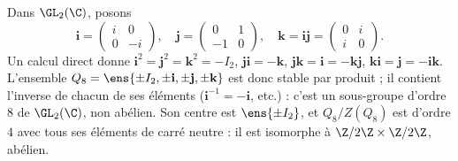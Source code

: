 \begin{exemple}\label{ex-q8}
Dans $\GL_2(\C)$, posons
\[\mathbf i=\begin{pmatrix}i&0\\0&-i\end{pmatrix},\quad\mathbf j=\begin{pmatrix}0&1\\-1&0\end{pmatrix},\quad\mathbf k=\mathbf i\mathbf j=\begin{pmatrix}0&i\\i&0\end{pmatrix}.\]
Un calcul direct donne $\mathbf i^2=\mathbf j^2=\mathbf k^2=-I_2$, $\mathbf j\mathbf i=-\mathbf k$, $\mathbf j\mathbf k=\mathbf i=-\mathbf k\mathbf j$, $\mathbf k\mathbf i=\mathbf j=-\mathbf i\mathbf k$. L'ensemble $Q_8=\ens{\pm I_2,\pm\mathbf i,\pm\mathbf j,\pm\mathbf k}$ est donc stable par produit ; il contient l'inverse de chacun de ses éléments ($\mathbf i^{-1}=-\mathbf i$, etc.) : c'est un sous-groupe d'ordre $8$ de $\GL_2(\C)$, non abélien. Son centre est $\ens{\pm I_2}$, et $Q_8/Z(Q_8)$ est d'ordre $4$ avec tous ses éléments de carré neutre : il est isomorphe à $\Z/2\Z\times\Z/2\Z$, abélien.
\end{exemple}

